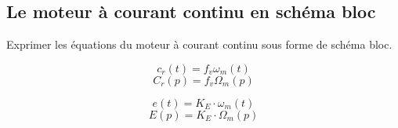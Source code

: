 \documentclass[10pt,fleqn]{article} %
\begin{document}
\subsection{Le moteur à courant continu en schéma bloc}
\begin{exemple}
Exprimer les équations du moteur à courant continu sous forme de schéma bloc.

\begin{minipage}[c]{.3\linewidth}
$$
c_r(t) = f_v \omega_m(t)
$$
$$
C_r(p) = f_v \Omega_m(p)
$$
\end{minipage}\hfill
\begin{minipage}[c]{.3\linewidth}
\end{minipage} \hfill
\begin{minipage}[c]{.3\linewidth}
\end{minipage}

\begin{minipage}[c]{.3\linewidth}
$$
e(t)=K_E \cdot \omega_m(t) $$
$$
E(p)=K_E \cdot \Omega_m(p)
$$
\end{minipage}\hfill
\begin{minipage}[c]{.3\linewidth}
\end{minipage} \hfill
\begin{minipage}[c]{.3\linewidth}
\end{minipage}


\end{exemple}
\end{document}
